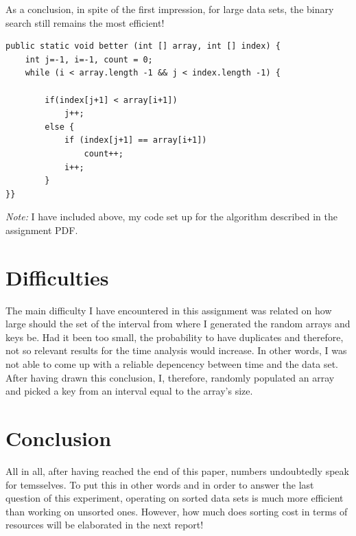 \documentclass[a4paper,11pt]{article}
\begin{document}
As a conclusion, in spite of the first impression, for large data sets, the binary search still remains the most efficient! 

\begin{verbatim}
public static void better (int [] array, int [] index) {
    int j=-1, i=-1, count = 0;
    while (i < array.length -1 && j < index.length -1) {
    
        if(index[j+1] < array[i+1]) 
            j++;
        else {
            if (index[j+1] == array[i+1]) 
                count++;
            i++;
        }
}}
\end{verbatim}
    
\textit{Note: } I have included above, my code set up for the algorithm described in the assignment PDF.


\section*{Difficulties}

The main difficulty I have encountered in this assignment was related on how large should the set of the interval from where I generated the
random arrays and keys be. Had it been too small, the probability to have duplicates and therefore, not so relevant 
results for the time analysis would increase. In other words, I was not able 
to come up with a reliable depencency between time and the data set. After having drawn this conclusion, 
I, therefore, randomly populated an array and picked a key from an 
interval equal to the array's size.

\section*{Conclusion}
All in all, after having reached the end of this paper, numbers undoubtedly speak for temsselves. 
To put this in other words and in order to answer the last question of this 
experiment, operating on
sorted data sets is much more efficient than working on unsorted ones. However, how much does sorting cost in terms of 
resources will be elaborated in the next report!
\end{document}
